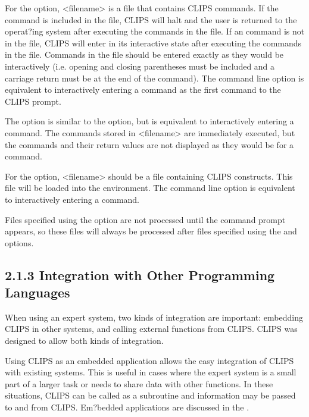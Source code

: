 \documentclass[letterpaper,10pt,english]{sphinxmanual}
\begin{document}
For the  option, \textless{}filename\textgreater{} is a file that contains CLIPS
commands. If the  command is included in the file, CLIPS will
halt and the user is returned to the operat?ing system after executing
the commands in the file. If an  command is not in the file,
CLIPS will enter in its interactive state after executing the commands
in the file. Commands in the file should be entered exactly as they
would be interactively (i.e. opening and closing parentheses must be
included and a carriage return must be at the end of the command). The
 command line option is equivalent to interactively entering a
 command as the first command to the CLIPS prompt.

The  option is similar to the  option, but is equivalent to
interactively entering a  command. The commands stored in
\textless{}filename\textgreater{} are immediately executed, but the commands and their return
values are not displayed as they would be for a  command.

For the  option, \textless{}filename\textgreater{} should be a file containing CLIPS
constructs. This file will be loaded into the environment. The 
command line option is equivalent to interactively entering a 
command.

Files specified using the  option are not processed until the
command prompt appears, so these files will always be processed after
files specified using the  and  options.


\subsection{2.1.3 Integration with Other Programming Languages}
\label{\detokenize{overview:integration-with-other-programming-languages}}
When using an expert system, two kinds of integration are important:
embedding CLIPS in other systems, and calling external functions from
CLIPS. CLIPS was designed to allow both kinds of integration.

Using CLIPS as an embedded application allows the easy integration of
CLIPS with existing systems. This is useful in cases where the expert
system is a small part of a larger task or needs to share data with
other functions. In these situations, CLIPS can be called as a
subroutine and information may be passed to and from CLIPS. Em?bedded
applications are discussed in the .
\end{document}

